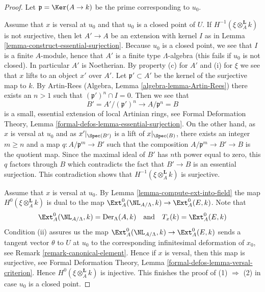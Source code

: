 \begin{proof}
Let $\mathfrak p = \Ker(A \to k)$ be the prime corresponding to $u_0$.

\medskip\noindent
Assume that $x$ is versal at $u_0$ and that $u_0$ is a closed point of $U$.
If $H^{-1}(\xi \otimes_A^{\mathbf{L}} k)$ is not surjective, then
let $A' \to A$ be an extension with kernel $I$ as in
Lemma \ref{lemma-construct-essential-surjection}.
Because $u_0$ is a closed point, we see that $I$ is a finite $A$-module,
hence that $A'$ is a finite type $\Lambda$-algebra (this fails if
$u_0$ is not closed). In particular $A'$ is Noetherian.
By property (c) for $A'$ and (i) for $\xi$ we see that $x$ lifts to
an object $x'$ over $A'$.
Let $\mathfrak p' \subset A'$ be the kernel of the surjective map to $k$.
By Artin-Rees (Algebra, Lemma \ref{algebra-lemma-Artin-Rees})
there exists an $n > 1$ such that $(\mathfrak p')^n \cap I = 0$.
Then we see that
$$
B' = A'/(\mathfrak p')^n \longrightarrow A/\mathfrak p^n = B
$$
is a small, essential extension of local Artinian rings, see
Formal Deformation Theory, Lemma
\ref{formal-defos-lemma-essential-surjection}.
On the other hand, as $x$ is versal at $u_0$ and as $x'|_{\Spec(B')}$
is a lift of $x|_{\Spec(B)}$, there exists an integer
$m \geq n$ and a map $q : A/\mathfrak p^m \to B'$
such that the composition
$A/\mathfrak p^m \to B' \to B$ is the quotient map.
Since the maximal ideal of $B'$ has $n$th power equal to zero, this
$q$ factors through $B$ which contradicts the fact that $B' \to B$ is an
essential surjection. This contradiction shows that
$H^{-1}(\xi \otimes_A^{\mathbf{L}} k)$
is surjective.

\medskip\noindent
Assume that $x$ is versal at $u_0$. By Lemma \ref{lemma-compute-ext-into-field}
the map $H^0(\xi \otimes_A^{\mathbf{L}} k)$ is dual to the map
$\Ext^0_A(\NL_{A/\Lambda}, k) \to \Ext^0_A(E, k)$. Note that
$$
\Ext^0_A(\NL_{A/\Lambda}, k) = \text{Der}_\Lambda(A, k)
\quad\text{and}\quad
T_x(k) = \Ext^0_A(E, k)
$$
Condition (ii) assures us the map
$\Ext^0_A(\NL_{A/\Lambda}, k) \to \Ext^0_A(E, k)$
sends a tangent vector $\theta$ to $U$ at $u_0$ to the corresponding
infinitesimal deformation of $x_0$, see Remark \ref{remark-canonical-element}.
Hence if $x$ is versal, then this map is surjective, see
Formal Deformation Theory, Lemma \ref{formal-defos-lemma-versal-criterion}.
Hence $H^0(\xi \otimes_A^{\mathbf{L}} k)$ is injective.
This finishes the proof of (1) $\Rightarrow$ (2) in case $u_0$ is a
closed point.


\end{proof}
